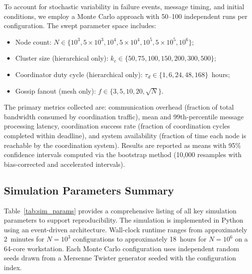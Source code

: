\documentclass[journal]{IEEEtran}
\begin{document}
To account for stochastic variability in failure events, message timing, and initial conditions, we employ a Monte Carlo approach with 50--100 independent runs per configuration. The swept parameter space includes:

\begin{itemize}
    \item Node count: $N \in \{10^3, 5 \times 10^3, 10^4, 5 \times 10^4, 10^5, 5 \times 10^5, 10^6\}$;
    \item Cluster size (hierarchical only): $k_c \in \{50, 75, 100, 150, 200, 300, 500\}$;
    \item Coordinator duty cycle (hierarchical only): $\tau_d \in \{1, 6, 24, 48, 168\}$~hours;
    \item Gossip fanout (mesh only): $f \in \{3, 5, 10, 20, \sqrt{N}\}$.
\end{itemize}

The primary metrics collected are: communication overhead (fraction of total bandwidth consumed by coordination traffic), mean and 99th-percentile message processing latency, coordination success rate (fraction of coordination cycles completed within deadline), and system availability (fraction of time each node is reachable by the coordination system). Results are reported as means with 95\% confidence intervals computed via the bootstrap method (10{,}000 resamples with bias-corrected and accelerated intervals).

\subsection{Simulation Parameters Summary}

Table~\ref{tab:sim_params} provides a comprehensive listing of all key simulation parameters to support reproducibility. The simulation is implemented in Python using an event-driven architecture. Wall-clock runtime ranges from approximately 2~minutes for $N = 10^3$ configurations to approximately 18~hours for $N = 10^6$ on a 64-core workstation. Each Monte Carlo configuration uses independent random seeds drawn from a Mersenne Twister generator seeded with the configuration index.
\end{document}
